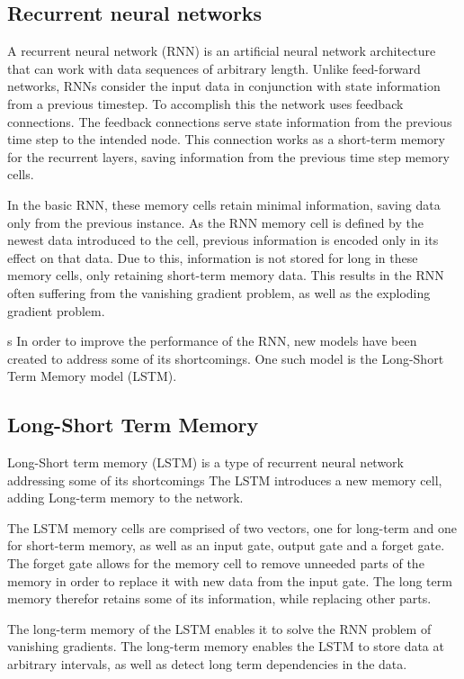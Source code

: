 
\subsection{Recurrent neural networks}

A recurrent neural network (RNN) is an artificial neural network architecture that can work with data sequences of arbitrary length.
Unlike feed-forward networks, RNNs consider the input data in conjunction with state information from a previous timestep.
To accomplish this the network uses feedback connections.
The feedback connections serve state information from the previous time step to the intended node.
This connection works as a short-term memory for the recurrent layers, saving information from the previous time step memory cells.

In the basic RNN, these memory cells retain minimal information, saving data only from the previous instance.
As the RNN memory cell is defined by the newest data introduced to the cell, previous information is encoded only in its effect on that data.
Due to this, information is not stored for long in these memory cells, only retaining short-term memory data.
This results in the RNN often suffering from the vanishing gradient problem, as well as the exploding gradient problem.

s
In order to improve the performance of the RNN, new models have been created to address some of its shortcomings.
One such model is the Long-Short Term Memory model (LSTM).

\subsection{Long-Short Term Memory}

Long-Short term memory (LSTM) is a type of recurrent neural network addressing some of its shortcomings
The LSTM introduces a new memory cell, adding Long-term memory to the network.

The LSTM memory cells are comprised of two vectors, one for long-term and one for short-term memory,
as well as an input gate, output gate and a forget gate.
The forget gate allows for the memory cell to remove unneeded parts of the memory in order to replace it with new data from the input gate.
The long term memory therefor retains some of its information, while replacing other parts.

The long-term memory of the LSTM enables it to solve the RNN problem of vanishing gradients.
The long-term memory enables the LSTM to store data at arbitrary intervals, as well as detect long term dependencies in the data.

